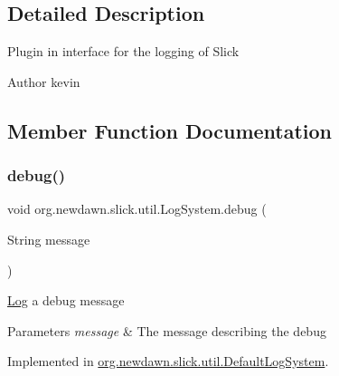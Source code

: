 \subsection{Detailed Description}
Plugin in interface for the logging of Slick

\begin{DoxyAuthor}{Author}
kevin 
\end{DoxyAuthor}


\subsection{Member Function Documentation}
\mbox{\label{interfaceorg_1_1newdawn_1_1slick_1_1util_1_1_log_system_af8c0140f915bdebab6ac9062e9fea015}} 
\subsubsection{\texorpdfstring{debug()}{debug()}}
{\footnotesize\ttfamily void org.\+newdawn.\+slick.\+util.\+Log\+System.\+debug (\begin{DoxyParamCaption}\item[{String}]{message }\end{DoxyParamCaption})}

\mbox{\hyperlink{classorg_1_1newdawn_1_1slick_1_1util_1_1_log}{Log}} a debug message


\begin{DoxyParams}{Parameters}
{\em message} & The message describing the debug \\
\hline
\end{DoxyParams}


Implemented in \mbox{\hyperlink{classorg_1_1newdawn_1_1slick_1_1util_1_1_default_log_system_ac1498dd15e05ecbca4f376da7bbdaa25}{org.\+newdawn.\+slick.\+util.\+Default\+Log\+System}}.

\mbox{\label{interfaceorg_1_1newdawn_1_1slick_1_1util_1_1_log_system_a9ba18920fcc1e6b04324a1b9dfb40640}} 
